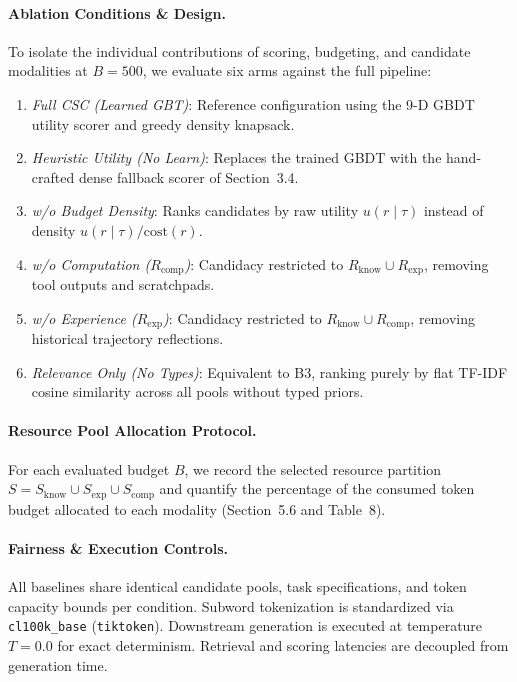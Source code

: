 \documentclass{article}
\begin{document}
\paragraph{Ablation Conditions \& Design.} To isolate the individual contributions of scoring, budgeting, and candidate modalities at $B=500$, we evaluate six arms against the full pipeline:
\begin{enumerate}
\item \textit{Full CSC (Learned GBT)}: Reference configuration using the 9-D GBDT utility scorer and greedy density knapsack.
\item \textit{Heuristic Utility (No Learn)}: Replaces the trained GBDT with the hand-crafted dense fallback scorer of Section~3.4.
\item \textit{w/o Budget Density}: Ranks candidates by raw utility $u(r \mid \tau)$ instead of density $u(r \mid \tau)/\text{cost}(r)$.
\item \textit{w/o Computation ($R_{\text{comp}}$)}: Candidacy restricted to $R_{\text{know}} \cup R_{\text{exp}}$, removing tool outputs and scratchpads.
\item \textit{w/o Experience ($R_{\text{exp}}$)}: Candidacy restricted to $R_{\text{know}} \cup R_{\text{comp}}$, removing historical trajectory reflections.
\item \textit{Relevance Only (No Types)}: Equivalent to B3, ranking purely by flat TF-IDF cosine similarity across all pools without typed priors.
\end{enumerate}

\paragraph{Resource Pool Allocation Protocol.} For each evaluated budget $B$, we record the selected resource partition $S = S_{\text{know}} \cup S_{\text{exp}} \cup S_{\text{comp}}$ and quantify the percentage of the consumed token budget allocated to each modality (Section~5.6 and Table~8).

\paragraph{Fairness \& Execution Controls.} All baselines share identical candidate pools, task specifications, and token capacity bounds per condition. Subword tokenization is standardized via \texttt{cl100k\_base} (\texttt{tiktoken}). Downstream generation is executed at temperature $T=0.0$ for exact determinism. Retrieval and scoring latencies are decoupled from generation time.
\end{document}
